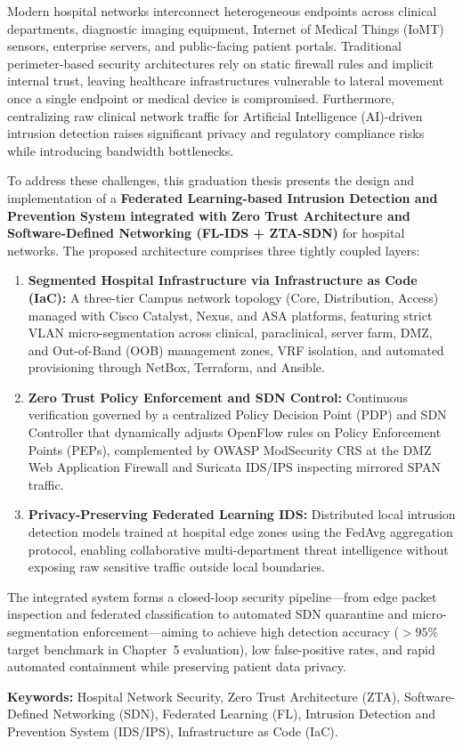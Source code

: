 
Modern hospital networks interconnect heterogeneous endpoints across clinical departments, diagnostic imaging equipment, Internet of Medical Things (IoMT) sensors, enterprise servers, and public-facing patient portals. Traditional perimeter-based security architectures rely on static firewall rules and implicit internal trust, leaving healthcare infrastructures vulnerable to lateral movement once a single endpoint or medical device is compromised. Furthermore, centralizing raw clinical network traffic for Artificial Intelligence (AI)-driven intrusion detection raises significant privacy and regulatory compliance risks while introducing bandwidth bottlenecks.

To address these challenges, this graduation thesis presents the design and implementation of a \textbf{Federated Learning-based Intrusion Detection and Prevention System integrated with Zero Trust Architecture and Software-Defined Networking (FL-IDS + ZTA-SDN)} for hospital networks. The proposed architecture comprises three tightly coupled layers:
\begin{enumerate}[leftmargin=1.8em, itemsep=4pt]
  \item \textbf{Segmented Hospital Infrastructure via Infrastructure as Code (IaC):} A three-tier Campus network topology (Core, Distribution, Access) managed with Cisco Catalyst, Nexus, and ASA platforms, featuring strict VLAN micro-segmentation across clinical, paraclinical, server farm, DMZ, and Out-of-Band (OOB) management zones, VRF isolation, and automated provisioning through NetBox, Terraform, and Ansible.
  \item \textbf{Zero Trust Policy Enforcement and SDN Control:} Continuous verification governed by a centralized Policy Decision Point (PDP) and SDN Controller that dynamically adjusts OpenFlow rules on Policy Enforcement Points (PEPs), complemented by OWASP ModSecurity CRS at the DMZ Web Application Firewall and Suricata IDS/IPS inspecting mirrored SPAN traffic.
  \item \textbf{Privacy-Preserving Federated Learning IDS:} Distributed local intrusion detection models trained at hospital edge zones using the FedAvg aggregation protocol, enabling collaborative multi-department threat intelligence without exposing raw sensitive traffic outside local boundaries.
\end{enumerate}

The integrated system forms a closed-loop security pipeline---from edge packet inspection and federated classification to automated SDN quarantine and micro-segmentation enforcement---aiming to achieve high detection accuracy ($>95\%$ target benchmark in Chapter~5 evaluation), low false-positive rates, and rapid automated containment while preserving patient data privacy.

\vspace{0.5cm}
\noindent\textbf{Keywords:} Hospital Network Security, Zero Trust Architecture (ZTA), Software-Defined Networking (SDN), Federated Learning (FL), Intrusion Detection and Prevention System (IDS/IPS), Infrastructure as Code (IaC).
